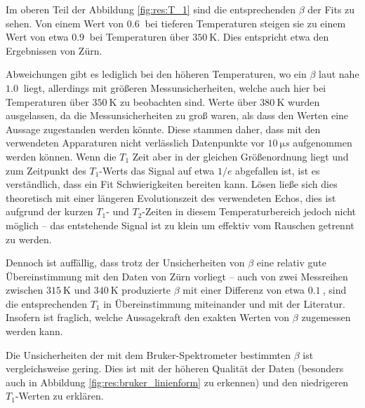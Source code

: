 Im oberen Teil der Abbildung \ref{fig:res:T_1} sind die entsprechenden $\beta$ der Fits zu sehen. Von einem Wert von $\SI{0.6}{}$ bei tieferen Temperaturen steigen sie zu einem Wert von etwa $\SI{0.9}{}$ bei Temperaturen über $\SI{350}{\kelvin}$. Dies entspricht etwa den Ergebnissen von Zürn.

Abweichungen gibt es lediglich bei den höheren Temperaturen, wo ein $\beta$ laut \cite{zuern_paper} nahe $\SI{1.0}{}$ liegt, allerdings mit größeren Messunsicherheiten, welche auch hier bei Temperaturen über $\SI{350}{\kelvin}$ zu beobachten sind. Werte über $\SI{380}{\kelvin}$ wurden ausgelassen, da die Messunsicherheiten zu groß waren, als dass den Werten eine Aussage zugestanden werden könnte. Diese stammen daher, dass mit den verwendeten Apparaturen nicht verlässlich Datenpunkte vor $\SI{10}{\micro s}$ aufgenommen werden können. Wenn die $T_1$ Zeit aber in der gleichen Größenordnung liegt und zum Zeitpunkt des $T_1$-Werts das Signal auf etwa $1/e$ abgefallen ist, ist es verständlich, dass ein Fit Schwierigkeiten bereiten kann. Lösen ließe sich dies theoretisch mit einer längeren Evolutionszeit des verwendeten Echos, dies ist aufgrund der kurzen $T_1$- und $T_2$-Zeiten in diesem Temperaturbereich jedoch nicht möglich -- das entstehende Signal ist zu klein um effektiv vom Rauschen getrennt zu werden.

Dennoch ist auffällig, dass trotz der Unsicherheiten von $\beta$ eine relativ gute Übereinstimmung mit den Daten von Zürn vorliegt -- auch von zwei Messreihen zwischen $\SI{315}{\kelvin}$ und $\SI{340}{\kelvin}$ produzierte $\beta$ mit einer Differenz von etwa $\SI{0.1}{}$, sind die entsprechenden $T_1$ in Übereinstimmung miteinander und mit der Literatur. Insofern ist fraglich, welche Aussagekraft den exakten Werten von $\beta$ zugemessen werden kann.

Die Unsicherheiten der mit dem Bruker-Spektrometer bestimmten $\beta$ ist vergleichsweise gering. Dies ist mit der höheren Qualität der Daten (besonders auch in Abbildung \ref{fig:res:bruker_linienform} zu erkennen) und den niedrigeren $T_1$-Werten zu erklären.


